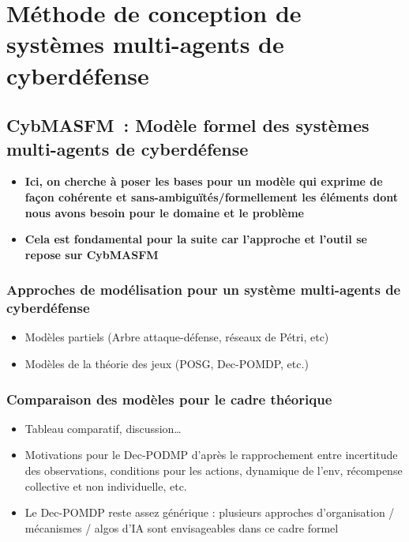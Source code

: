 \chapter{Méthode de conception de systèmes multi-agents de cyberdéfense}\label{ch:cybmasdm} %

\section{CybMASFM : Modèle formel des systèmes multi-agents de cyberdéfense}\label{sec:cybmasfm}

\begin{itemize}
    \item \textbf{Ici, on cherche à poser les bases pour un modèle qui exprime de façon cohérente et sans-ambiguïtés/formellement les éléments dont nous avons besoin pour le domaine et le problème}
    \item \textbf{Cela est fondamental pour la suite car l'approche et l'outil se repose sur CybMASFM}
\end{itemize}

\subsection{Approches de modélisation pour un système multi-agents de cyberdéfense}
\begin{itemize}

    \item Modèles partiels (Arbre attaque-défense, réseaux de Pétri, etc)
    \item Modèles de la théorie des jeux (POSG, Dec-POMDP, etc.)
\end{itemize}

\subsection{Comparaison des modèles pour le cadre théorique}
\begin{itemize}

    \item Tableau comparatif, discussion…
    \item Motivations pour le Dec-PODMP d'après le rapprochement entre incertitude des observations, conditions pour les actions, dynamique de l'env, récompense collective et non individuelle, etc.
    \item Le Dec-POMDP reste assez générique : plusieurs approches d'organisation / mécanismes / algos d'IA sont envisageables dans ce cadre formel
\end{itemize}

